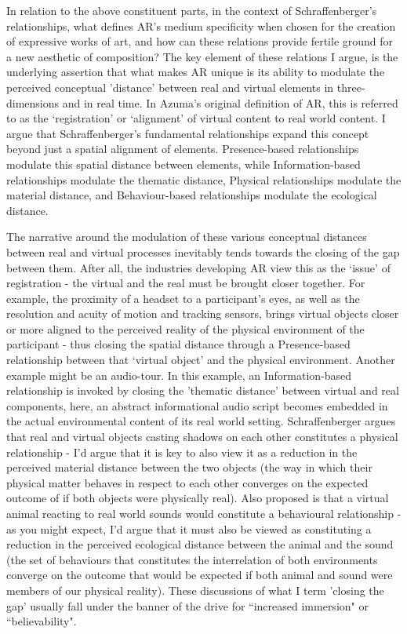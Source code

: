 In relation to the above constituent parts, in the context of Schraffenberger's relationships, what defines AR's medium specificity when chosen for the creation of expressive works of art, and how can these relations provide fertile ground for a new aesthetic of composition? The key element of these relations I argue, is the underlying assertion that what makes AR unique is its ability to modulate the perceived conceptual 'distance' between real and virtual elements in three-dimensions and in real time. In Azuma's \citeyearpar[]{azuma1997} original definition of AR, this is referred to as the `registration' or `alignment' of virtual content to real world content. I argue that Schraffenberger's fundamental relationships expand this concept beyond just a spatial alignment of elements. Presence-based relationships modulate this spatial distance between elements, while Information-based relationships modulate the thematic distance, Physical relationships modulate the material distance, and Behaviour-based relationships modulate the ecological distance. 

The narrative around the modulation of these various conceptual distances between real and virtual processes inevitably tends towards the closing of the gap between them. After all, the industries developing AR view this as the `issue' of registration - the virtual and the real must be brought closer together. For example, the proximity of a headset to a participant's eyes, as well as the resolution and acuity of motion and tracking sensors, brings virtual objects closer or more aligned to the perceived reality of the physical environment of the participant - thus closing the spatial distance through a Presence-based relationship between that `virtual object' and the physical environment. Another example might be an audio-tour. In this example, an Information-based relationship is invoked by closing the 'thematic distance' between virtual and real components, here, an abstract informational audio script becomes embedded in the actual environmental content of its real world setting. Schraffenberger argues that real and virtual objects casting shadows on each other constitutes a physical relationship - I'd argue that it is key to also view it as a reduction in the perceived material distance between the two objects (the way in which their physical matter behaves in respect to each other converges on the expected outcome of if both objects were physically real). Also proposed is that a virtual animal reacting to real world sounds would constitute a behavioural relationship - as you might expect, I'd argue that it must also be viewed as constituting a reduction in the perceived ecological distance between the animal and the sound (the set of behaviours that constitutes the interrelation of both environments converge on the outcome that would be expected if both animal and sound were members of our physical reality). These discussions of what I term 'closing the gap' usually fall under the banner of the drive for ``increased immersion" or ``believability". 

